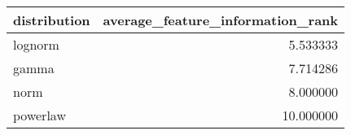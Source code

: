 \begin{tabular}{lr}
\toprule
distribution &  average\_feature\_information\_rank \\
\midrule
     lognorm &                          5.533333 \\
       gamma &                          7.714286 \\
        norm &                          8.000000 \\
    powerlaw &                         10.000000 \\
\bottomrule
\end{tabular}
